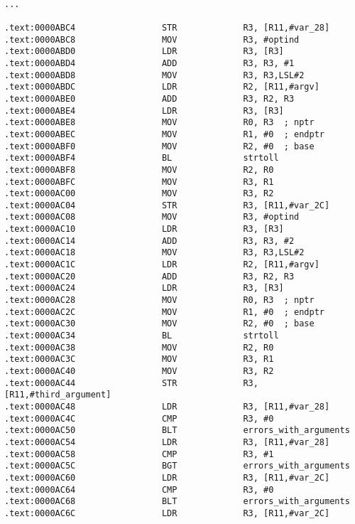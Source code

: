 \begin{lstlisting}

...

.text:0000ABC4                 STR             R3, [R11,#var_28]
.text:0000ABC8                 MOV             R3, #optind
.text:0000ABD0                 LDR             R3, [R3]
.text:0000ABD4                 ADD             R3, R3, #1
.text:0000ABD8                 MOV             R3, R3,LSL#2
.text:0000ABDC                 LDR             R2, [R11,#argv]
.text:0000ABE0                 ADD             R3, R2, R3
.text:0000ABE4                 LDR             R3, [R3]
.text:0000ABE8                 MOV             R0, R3  ; nptr
.text:0000ABEC                 MOV             R1, #0  ; endptr
.text:0000ABF0                 MOV             R2, #0  ; base
.text:0000ABF4                 BL              strtoll
.text:0000ABF8                 MOV             R2, R0
.text:0000ABFC                 MOV             R3, R1
.text:0000AC00                 MOV             R3, R2
.text:0000AC04                 STR             R3, [R11,#var_2C]
.text:0000AC08                 MOV             R3, #optind
.text:0000AC10                 LDR             R3, [R3]
.text:0000AC14                 ADD             R3, R3, #2
.text:0000AC18                 MOV             R3, R3,LSL#2
.text:0000AC1C                 LDR             R2, [R11,#argv]
.text:0000AC20                 ADD             R3, R2, R3
.text:0000AC24                 LDR             R3, [R3]
.text:0000AC28                 MOV             R0, R3  ; nptr
.text:0000AC2C                 MOV             R1, #0  ; endptr
.text:0000AC30                 MOV             R2, #0  ; base
.text:0000AC34                 BL              strtoll
.text:0000AC38                 MOV             R2, R0
.text:0000AC3C                 MOV             R3, R1
.text:0000AC40                 MOV             R3, R2
.text:0000AC44                 STR             R3, [R11,#third_argument]
.text:0000AC48                 LDR             R3, [R11,#var_28]
.text:0000AC4C                 CMP             R3, #0
.text:0000AC50                 BLT             errors_with_arguments
.text:0000AC54                 LDR             R3, [R11,#var_28]
.text:0000AC58                 CMP             R3, #1
.text:0000AC5C                 BGT             errors_with_arguments
.text:0000AC60                 LDR             R3, [R11,#var_2C]
.text:0000AC64                 CMP             R3, #0
.text:0000AC68                 BLT             errors_with_arguments
.text:0000AC6C                 LDR             R3, [R11,#var_2C]

\end{lstlisting}
